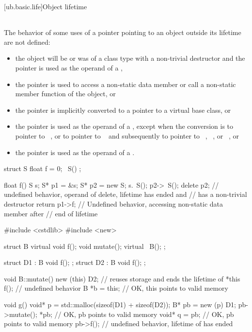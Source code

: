 [ub.basic.life]{Object lifetime}

\pnum
{} \\
The behavior of some uses of a pointer
pointing to an object outside its lifetime
are not defined:
\begin{itemize}
\item
  the object will be or was of a class type with a non-trivial destructor
  and the pointer is used as the operand of a ,
\item
  the pointer is used to access a non-static data member or call a
  non-static member function of the object, or
\item
  the pointer is implicitly converted to a pointer
  to a virtual base class, or
\item
  the pointer is used as the operand of a
  , except when the conversion
  is to pointer to \cv{}~, or to pointer to \cv{}~
  and subsequently to pointer to
  \cv{}~,
  \cv{}~, or
  \cv{}~, or
\item
  the pointer is used as the operand of a
  .
\end{itemize}

\pnum
\begin{example}
\begin{codeblock}
struct S {
  float f = 0;
  ~S() {}
};

float f() {
  S s;
  S* p1 = &s;
  S* p2 = new S;
  s.~S();
  p2->~S();
  delete p2;            // undefined behavior, operand of delete, lifetime has ended and 
                        // has a non-trivial destructor
  return p1->f;         // Undefined behavior, accessing non-static data member after
                        // end of lifetime
}
\end{codeblock}
\end{example}
\begin{example}
\begin{codeblock}
#include <cstdlib>
#include <new>

struct B {
  virtual void f();
  void mutate();
  virtual ~B();
};

struct D1 : B {
  void f();
};
struct D2 : B {
  void f();
};

void B::mutate() {
  new (this) D2;        // reuses storage and ends the lifetime of *this
  f();                  // undefined behavior
  B *b = this;          // OK, this points to valid memory
}

void g() {
  void* p = std::malloc(sizeof(D1) + sizeof(D2));
  B* pb = new (p) D1;
  pb->mutate();
  *pb;                  // OK, pb points to valid memory
  void* q = pb;         // OK, pb points to valid memory
  pb->f();              // undefined behavior, lifetime of  has ended
}
\end{codeblock}
\end{example}

